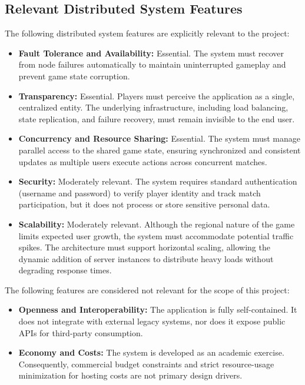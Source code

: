 \documentclass{scrartcl}
\begin{document}
\subsection*{Relevant Distributed System Features}
The following distributed system features are explicitly relevant to the project:

\begin{itemize}
    \item \textbf{Fault Tolerance and Availability:} Essential. The system must recover from node failures automatically to maintain uninterrupted gameplay and prevent game state corruption.
    \item \textbf{Transparency:} Essential. Players must perceive the application as a single, centralized entity. The underlying infrastructure, including load balancing, state replication, and failure recovery, must remain invisible to the end user.
    \item \textbf{Concurrency and Resource Sharing:} Essential. The system must manage parallel access to the shared game state, ensuring synchronized and consistent updates as multiple users execute actions across concurrent matches.
    \item \textbf{Security:} Moderately relevant. The system requires standard authentication (username and password) to verify player identity and track match participation, but it does not process or store sensitive personal data.
    \item \textbf{Scalability:} Moderately relevant. Although the regional nature of the game limits expected user growth, the system must accommodate potential traffic spikes. The architecture must support horizontal scaling, allowing the dynamic addition of server instances to distribute heavy loads without degrading response times.
\end{itemize}

The following features are considered not relevant for the scope of this project:

\begin{itemize}
    \item \textbf{Openness and Interoperability:} The application is fully self-contained. It does not integrate with external legacy systems, nor does it expose public APIs for third-party consumption.
    \item \textbf{Economy and Costs:} The system is developed as an academic exercise. Consequently, commercial budget constraints and strict resource-usage minimization for hosting costs are not primary design drivers.
\end{itemize}
\end{document}
